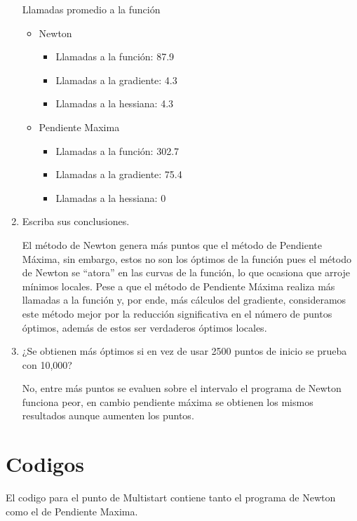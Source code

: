 \documentclass[12pt]{article}
\begin{document}
\begin{enumerate}
    Llamadas promedio a la función
    \begin{itemize}
        \item Newton
        \begin{itemize}
            \item Llamadas a la función: 87.9
            \item Llamadas a la gradiente: 4.3
            \item Llamadas a la hessiana: 4.3
        \end{itemize}
        \item Pendiente Maxima
        \begin{itemize}
            \item Llamadas a la función: 302.7
            \item Llamadas a la gradiente: 75.4
            \item Llamadas a la hessiana: 0
        \end{itemize}
    \end{itemize}
    \item Escriba sus conclusiones.
    
    El método de Newton genera más puntos que el método de Pendiente Máxima, sin embargo, estos no son los óptimos de la función pues el método de Newton se “atora” en las curvas de la función, lo que ocasiona que arroje mínimos locales.
    Pese a que el método de Pendiente Máxima realiza más llamadas a la función y, por ende, más cálculos del gradiente, consideramos este método mejor por la reducción significativa en el número de puntos óptimos, además de estos ser verdaderos óptimos locales.
    \item ¿Se obtienen más óptimos si en vez de usar 2500 puntos de inicio se prueba con 10,000?
    
    No, entre más puntos se evaluen sobre el intervalo el programa de Newton funciona peor, en cambio pendiente máxima se obtienen los mismos resultados aunque aumenten los puntos.
\end{enumerate}

\newpage

\section{Codigos}

El codigo para el punto de Multistart contiene tanto el programa de Newton como el de Pendiente Maxima.
\end{document}
